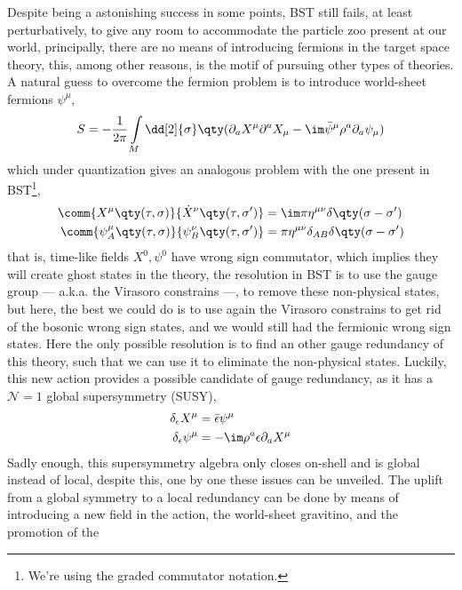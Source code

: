 Despite being a astonishing success in some points, BST still fails, at least perturbatively, to give 
any room to accommodate the particle zoo present at our world, principally, there are no means of 
introducing fermions in the target space theory, this, among other reasons, is the motif of pursuing other 
types of theories. A natural guess to overcome the fermion problem is to introduce world-sheet fermions $\psi^\mu$\cite{polchinski:vol2,witten:vol1}, 
\begin{align}
    S=-\frac{1}{2\pi}\int\limits_M\dd[2]{\sigma}\qty(\partial_aX^\mu\partial^aX_\mu-\im\bar\psi^\mu\rho^a\partial_a\psi_{\mu})\label{action:sst1}
\end{align}
which under quantization gives an analogous problem with the one present in BST\footnote{We're using the graded commutator notation.},
\begin{align*}
    \comm{X^\mu\qty(\tau,\sigma)}{\dot X^\nu\qty(\tau,\sigma')}&=\im\pi\eta^{\mu\nu}\delta\qty(\sigma-\sigma')\\
    \comm{\psi^\mu_A\qty(\tau,\sigma)}{\psi^\nu_B\qty(\tau,\sigma')}&=\pi\eta^{\mu\nu}\delta_{AB}\delta\qty(\sigma-\sigma')
\end{align*}
that is, time-like fields $X^0,\psi^0$ have wrong sign commutator, which implies they will create ghost states in 
the theory, the resolution in BST is to use the gauge group --- a.k.a. the Virasoro constrains ---, to remove 
these non-physical states, but here, the best we could do is to use again the Virasoro constrains to get rid of the 
bosonic wrong sign states, and we would still had the fermionic wrong sign states. Here the only possible resolution 
is to find an other gauge redundancy of this theory, such that we can use it to eliminate the non-physical states. 
Luckily, this new action provides a possible candidate of gauge redundancy, as it has a $\mathcal N=1$ global supersymmetry (SUSY),\begin{subequations}
\begin{align}
    \delta_\epsilon X^\mu&=\bar\epsilon\psi^\mu\\
    \delta_\epsilon\psi^\mu&=-\im\rho^a\epsilon\partial_aX^\mu
\end{align}\label{susy:pol1}\end{subequations}
Sadly enough, this supersymmetry algebra only closes on-shell and is global instead of local, despite this, 
one by one these issues can be unveiled. The uplift from a global symmetry to a local redundancy can be 
done by means of introducing a new field in the action, the world-sheet gravitino, and the promotion of the 

